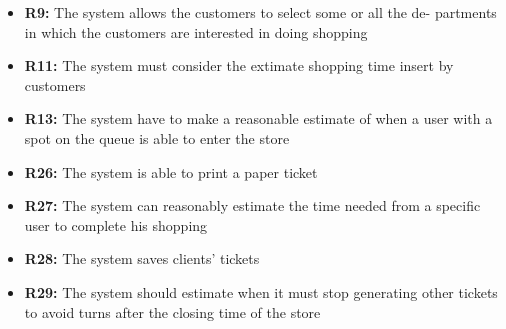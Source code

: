 \documentclass{article}
\begin{document}
\begin{center}
\begin{adjustwidth}{-2.8cm}{}
\begin{tabular}[h!]{|m{7.5em}|m{36em}|}
						\end{tabular}
					

				
					\end{adjustwidth}
				
														\begin{itemize}
					\bigskip
					\bigskip
					\bigskip
					\bigskip
					{\bfseries Required functional requirements: }
					
					
					\item {\bfseries R9: } The system allows the customers to select some or all the de-
					partments in which the customers are interested in doing shopping
					\item {\bfseries R11: } The system must consider the extimate shopping time insert
					by customers
					\item {\bfseries R13: } The system have to make a reasonable estimate of when a user with a spot on the queue is able to enter the store
					\item {\bfseries R26: } The system is able to print a paper ticket
					\item {\bfseries R27: } The system can reasonably estimate the time needed from a speciﬁc user to complete his shopping
					\item {\bfseries R28: } The system saves clients' tickets
					\item {\bfseries R29: } The system should estimate when it must stop generating other tickets to avoid turns after the closing time of the store
					
					
					

\end{itemize}
\end{center}
\end{document}
